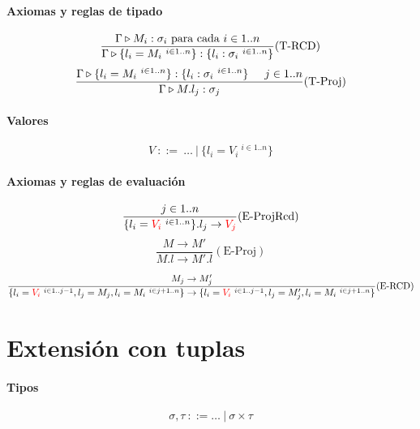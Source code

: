 \documentclass[10pt,a4paper]{article}
\begin{document}
\paragraph{Axiomas y reglas de tipado}
\begin{equation*}
\frac{\Gamma\triangleright M_i : \sigma_i \text{ para cada } i \in 1..n}{\Gamma\triangleright \{l_i = M_i ~^{i\in 1..n}\} : \{l_i : \sigma_i ~^{i\in 1..n}\}}(\text{T-RCD})
\end{equation*}
\vspace*{5mm}
\begin{equation*}
\frac{\Gamma\triangleright \{l_i = M_i ~^{i\in 1..n}\} : \{l_i : \sigma_i ~^{i\in 1..n}\}\hspace*{5mm} j \in 1..n}
{\Gamma\triangleright M.l_j : \sigma_j}(\text{T-Proj})
\end{equation*}

\paragraph{Valores}
$$V~::=~\dots~|~\{l_i = V_i ~^{i\in 1..n}\}$$

\paragraph{Axiomas y reglas de evaluación}

\begin{equation*}
\frac{j\in 1..n}{\{l_i = \color{red}V_i\color{black} ~^{i\in 1..n}\}.l_j \to \color{red}V_j\color{black}}(\text{E-ProjRcd})
\end{equation*}
\vspace*{5mm}
\begin{equation*}
\frac{M \to M'}{M.l \to M'.l}(\text{E-Proj})
\end{equation*}

\vspace*{5mm}
\begin{equation*}
\frac{M_j\to M_j'}{\{l_i = \color{red}V_i\color{black}~^{i\in 1..j-1}, l_j = M_j, l_i = M_i ~^{i\in j+1..n}\} \to \{l_i = \color{red}V_i\color{black}~^{i\in 1..j-1}, l_j = M'_j, l_i = M_i ~^{i\in j+1..n}\}}(\text{E-RCD})
\end{equation*}
\vspace*{5mm}

\newpage
\section{Extensión con tuplas}

\paragraph{Tipos}
$$\sigma,\tau~::= \dots~|~\sigma\times\tau$$
\end{document}
